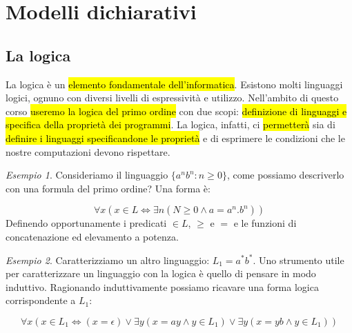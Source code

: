\documentclass[a4paper,11pt,oneside]{article}
\theoremstyle{plain}
\theoremstyle{definition}
\theoremstyle{remark}
\newtheorem{esempio}{Esempio}[section]
\begin{document}
\section{Modelli dichiarativi}\label{sec:modelli-dichairativi}

\subsection{La logica}\label{sec:logica}

La logica è un \hl{elemento fondamentale dell'informatica}. Esistono molti
linguaggi logici, ognuno con diversi livelli di espressività e utilizzo.
Nell'ambito di questo corso \hl{useremo la logica del primo ordine} con due
scopi: \hl{definizione di linguaggi e specifica della proprietà dei programmi}.
La logica, infatti, ci \hl{permetterà} sia di \hl{definire i linguaggi
specificandone le proprietà} e di esprimere le condizioni che le nostre
computazioni devono rispettare.

\begin{esempio}
  Consideriamo il linguaggio $\{a^n b^n : n \geq 0\}$, come possiamo descriverlo
  con una formula del primo ordine? Una forma è:

  \[
    \forall x (x \in L \iff \exists n (N \geq 0 \land a = a^n . b^n))
  \]
  Definendo opportunamente i predicati $\in L$, $\geq$ e $=$ e le funzioni di
  concatenazione ed elevamento a potenza.
\end{esempio}

\begin{esempio}
  Caratterizziamo un altro linguaggio: $L_1 = a^*b^*$. Uno strumento utile per
  caratterizzare un linguaggio con la logica è quello di pensare in modo
  induttivo. Ragionando induttivamente possiamo ricavare una forma logica
  corrispondente a $L_1$:

  \[
    \forall x (x \in L_1 \iff (x = \epsilon) \lor
    \exists y (x = ay \land y \in L_1) \lor \exists y (x = yb \land y \in L_1))
  \]
\end{esempio}
\end{document}
